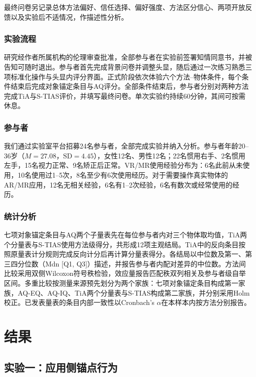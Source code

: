 \documentclass[review]{vgtc}
\begin{document}
最终问卷另记录总体方法偏好、信任选择、偏好强度、方法区分信心、两项开放反馈以及实验后不适情况，作描述性分析。

\subsubsection{实验流程}

研究经作者所属机构的伦理审查批准，全部参与者在实验前签署知情同意书，并被告知可随时退出。参与者首先完成背景问卷并调整头显，随后通过一次练习熟悉三项标准化操作与头显内评分界面。正式阶段依次体验六个方法--物体条件，每个条件结束后完成对象锚定条目与AQ评分。全部条件结束后，参与者分别对两种方法完成TiA与S-TIAS评价，并填写最终问卷。单次实验约持续60分钟，其间可按需休息。

\subsubsection{参与者}

我们通过实验室平台招募24名参与者，全部完成实验并纳入分析。参与者年龄20--36岁（$M=27.08$，$\mathrm{SD}=4.45$），女性12名、男性12名；22名惯用右手、2名惯用左手，15名视力正常、9名矫正后正常。VR/MR使用经验分布为：6名此前从未使用，10名使用过1--5次，8名至少有6次使用经历。对于需要操作真实物体的AR/MR应用，12名无相关经验，6名有1--2次经验，6名有数次或经常使用的经历。

\subsubsection{统计分析}

七项对象锚定条目与AQ两个子量表先在每位参与者内对三个物体取均值，TiA两个分量表与S-TIAS使用方法级得分，共形成12项主观结局。TiA中的反向条目按照原量表计分规则完成反向计分后再计算分量表得分。各结局以中位数及第一、第三四分位数（Mdn [Q1, Q3]）描述，并报告参与者内配对差异的中位数。方法间比较采用双侧Wilcoxon符号秩检验，效应量报告匹配秩双列相关及参与者级自举区间。多重比较按测量来源预先划分为两个家族：七项对象锚定条目构成第一家族，AQ-EQ、AQ-IQ、TiA两个分量表与S-TIAS构成第二家族，并分别采用Holm校正。已发表量表的条目内部一致性以Cronbach's $\alpha$在本样本内按方法分别报告。

\section{结果}\label{sec:results}

\subsection{实验一：应用侧锚点行为}
\end{document}
